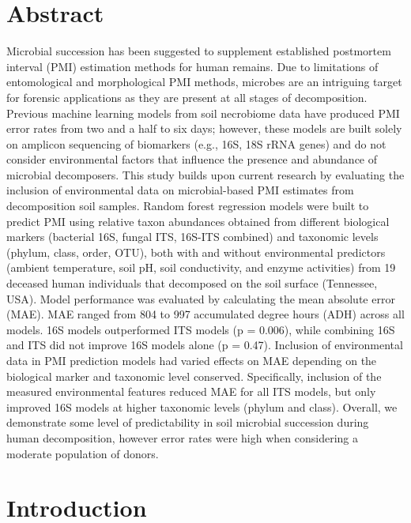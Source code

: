 \documentclass[
  10pt,
  letterpaper,
]{article}
\begin{document}
\section*{Abstract}
Microbial succession has been suggested to supplement established
postmortem interval (PMI) estimation methods for human remains. Due to
limitations of entomological and morphological PMI methods, microbes are
an intriguing target for forensic applications as they are present at
all stages of decomposition. Previous machine learning models from soil
necrobiome data have produced PMI error rates from two and a half to six
days; however, these models are built solely on amplicon sequencing of
biomarkers (e.g., 16S, 18S rRNA genes) and do not consider environmental
factors that influence the presence and abundance of microbial
decomposers. This study builds upon current research by evaluating the
inclusion of environmental data on microbial-based PMI estimates from
decomposition soil samples. Random forest regression models were built
to predict PMI using relative taxon abundances obtained from different
biological markers (bacterial 16S, fungal ITS, 16S-ITS combined) and
taxonomic levels (phylum, class, order, OTU), both with and without
environmental predictors (ambient temperature, soil pH, soil
conductivity, and enzyme activities) from 19 deceased human individuals
that decomposed on the soil surface (Tennessee, USA). Model performance
was evaluated by calculating the mean absolute error (MAE). MAE ranged
from 804 to 997 accumulated degree hours (ADH) across all models. 16S
models outperformed ITS models (p = 0.006), while combining 16S and ITS
did not improve 16S models alone (p = 0.47). Inclusion of environmental
data in PMI prediction models had varied effects on MAE depending on the
biological marker and taxonomic level conserved. Specifically, inclusion
of the measured environmental features reduced MAE for all ITS models,
but only improved 16S models at higher taxonomic levels (phylum and
class). Overall, we demonstrate some level of predictability in soil
microbial succession during human decomposition, however error rates
were high when considering a moderate population of donors.


\linenumbers
\section{Introduction}\label{introduction}
\end{document}
